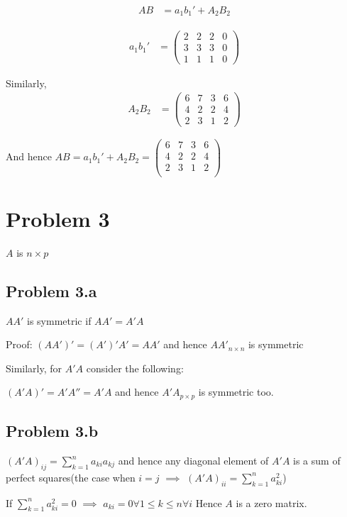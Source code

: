 \documentclass[a4paper]{article}
\begin{document}
\begin{align*}
AB &= a_1b_1' + A_2B_2
\end{align*}

\begin{align*}
a_1b_1' &= \begin{pmatrix}
2 &   2 & 2 &   0\\
3 &   3  &  3 &   0\\
1  &  1 &   1 &   0
\end{pmatrix}
\end{align*}

Similarly,
\begin{align*}
A_2B_2 &= \begin{pmatrix}
6 &   7 &   3 &   6\\
4 &   2  &  2  &  4\\
2  &  3   & 1 &   2
\end{pmatrix}
\end{align*}

And hence $AB = a_1b_1' + A_2B_2 = \begin{pmatrix}
6 &   7 &   3 &   6\\
4  &  2  &  2  &  4\\
2  &  3 &   1 &   2\\
\end{pmatrix}$
\section*{Problem 3}
$A$ is $n \times p$
\subsection*{Problem 3.a}
$AA'$ is symmetric if $AA' = A'A$

Proof:
$(AA')' = (A')'A' = AA'$ and hence $AA'_{n \times n}$ is symmetric

Similarly, for $A'A$ consider the following:

$(A'A)' = A'A''  = A'A$ and hence $A'A_{p \times p}$ is symmetric too.

\subsection*{Problem 3.b}

$(A'A)_{ij} = \sum_{k=1}^n a_{ki}a_{kj}$ and hence any diagonal element of $A'A$ is a sum of perfect squares(the case when $i=j$ $\implies$ $(A'A)_{ii} = \sum_{k=1}^n a_{ki}^2$)

If $\sum_{k=1}^n a_{ki}^2 =0$ $\implies$ $a_{ki} =0 \forall 1 \leq k \leq n \forall i$ Hence $A$ is a zero matrix.
\end{document}
